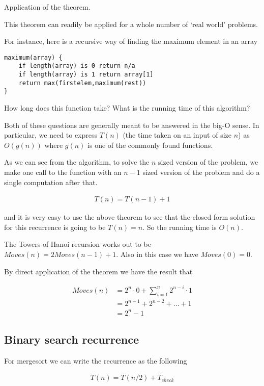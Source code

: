 \documentclass[12pt]{article}
\begin{document}
Application of the theorem.

This theorem can readily be applied for a whole number of `real world' problems.

For instance, here is a recursive way of finding the maximum element in an array

\begin{verbatim}
maximum(array) {
    if length(array) is 0 return n/a
    if length(array) is 1 return array[1]
    return max(firstelem,maximum(rest))
}
\end{verbatim}

How long does this function take? What is the running time of this algorithm? 

Both of these questions are generally meant to be answered in the big-O sense. In particular, we need to express $T(n)$ (the time taken on an input of size $n$) as $O(g(n))$ where $g(n)$ is one of the commonly found functions.

As we can see from the algorithm, to solve the $n$ sized version of the problem, we make one call to the function with an $n-1$ sized version of the problem and do a single computation after that.

\begin{align*}
T(n) = T(n-1) + 1
\end{align*}

and it is very easy to use the above theorem to see that the closed form solution for this recurrence is going to be $T(n) = n$. So the running time is $O(n)$.

\medskip

The Towers of Hanoi recursion works out to be $Moves(n) = 2Moves(n-1) + 1$. Also in this case we have $Moves(0) = 0$.

By direct application of the theorem we have the result that

\begin{align*}
Moves(n) &= 2^n \cdot 0+ \sum_{i=1}^n 2^{n-i} \cdot 1 \\
&=  2^{n-1} + 2^{n-2} + \ldots + 1 \\
&= 2^{n} - 1
\end{align*}

\subsection*{Binary search recurrence}

For mergesort we can write the recurrence as the following

\begin{align*}
T(n) = T(n/2) + T_{check}
\end{align*}
\end{document}
